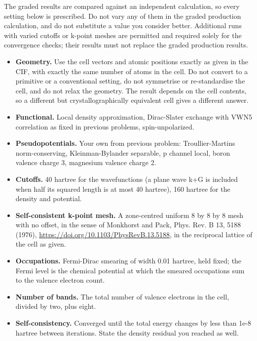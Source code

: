 
The graded results are compared against an independent calculation, so every setting below is prescribed. Do not
vary any of them in the graded production calculation, and do not substitute a value you consider better. Additional runs with varied cutoffs or k-point meshes are permitted and required solely for the convergence
checks; their results must not replace the graded production results.

\begin{itemize}[leftmargin=13pt,itemsep=1pt,topsep=2pt]
\item \textbf{Geometry.} Use the cell vectors and atomic positions exactly as given in the CIF, with exactly
      the same number of atoms in the cell. Do not convert to a primitive or a conventional setting, do not
      symmetrise or re-standardise the cell, and do not relax the geometry. The result depends on the cell
      contents, so a different but crystallographically equivalent cell gives a different answer.
\item \textbf{Functional.} Local density approximation, Dirac-Slater exchange with VWN5 correlation as fixed
      in previous problems, spin-unpolarized.
\item \textbf{Pseudopotentials.} Your own from previous problem: Troullier-Martins norm-conserving, Kleinman-Bylander
      separable, p channel local, boron valence charge 3, magnesium valence charge 2.
\item \textbf{Cutoffs.} 40 hartree for the wavefunctions (a plane wave k+G is included when half its squared length is at most 40 hartree), 160 hartree for the density and potential.
\item \textbf{Self-consistent k-point mesh.} A zone-centred uniform 8 by 8 by 8 mesh with no offset, in the
      sense of Monkhorst and Pack, Phys. Rev. B 13, 5188 (1976),
      \url{https://doi.org/10.1103/PhysRevB.13.5188}, in the reciprocal lattice of the cell as given.
\item \textbf{Occupations.} Fermi-Dirac smearing of width 0.01 hartree, held fixed; the Fermi level is the chemical potential at which the smeared occupations sum to the valence electron count.
\item \textbf{Number of bands.} The total number of valence electrons in the cell, divided by two, plus eight.
\item \textbf{Self-consistency.} Converged until the total energy changes by less than 1e-8 hartree between
      iterations. State the density residual you reached as well.
\end{itemize}


